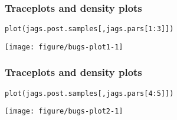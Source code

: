 \documentclass[color=usenames,dvipsnames]{beamer}\usepackage[]{graphicx}\usepackage[]{color}
\makeatletter
\newcommand{\hlnum}[1]{\textcolor[rgb]{0.69,0.494,0}{#1}}%
\newcommand{\hlopt}[1]{\textcolor[rgb]{0,0,0}{#1}}%
\newcommand{\hlstd}[1]{\textcolor[rgb]{0,0,0}{#1}}%
\newcommand{\hlkwd}[1]{\textcolor[rgb]{0.004,0.004,0.506}{#1}}%
\newenvironment{kframe}{%
 \def\at@end@of@kframe{}%
 \ifinner\ifhmode%
  \def\at@end@of@kframe{\end{minipage}}%
  \begin{minipage}{\columnwidth}%
 \fi\fi%
 \def\FrameCommand##1{\hskip\@totalleftmargin \hskip-\fboxsep
 \colorbox{shadecolor}{##1}\hskip-\fboxsep
     \hskip-\linewidth \hskip-\@totalleftmargin \hskip\columnwidth}%
 \MakeFramed {\advance\hsize-\width
   \@totalleftmargin\z@ \linewidth\hsize
   \@setminipage}}%
 {\par\unskip\endMakeFramed%
 \at@end@of@kframe}
\newenvironment{knitrout}{}{} %
\makeatother
\begin{document}
\begin{frame}[fragile]
  \frametitle{Traceplots and density plots}
\begin{knitrout}\footnotesize
{}\color{fgcolor}\begin{kframe}
\begin{alltt}
\hlkwd{plot}\hlstd{(jags.post.samples[,jags.pars[}\hlnum{1}\hlopt{:}\hlnum{3}\hlstd{]])}
\end{alltt}
\end{kframe}

{\centering \texttt{[image: figure/bugs-plot1-1]} 

}


\end{knitrout}
\end{frame}



\begin{frame}[fragile]
  \frametitle{Traceplots and density plots}
\begin{knitrout}\footnotesize
{}\color{fgcolor}\begin{kframe}
\begin{alltt}
\hlkwd{plot}\hlstd{(jags.post.samples[,jags.pars[}\hlnum{4}\hlopt{:}\hlnum{5}\hlstd{]])}
\end{alltt}
\end{kframe}

{\centering \texttt{[image: figure/bugs-plot2-1]} 

}


\end{knitrout}
\end{frame}
\end{document}
